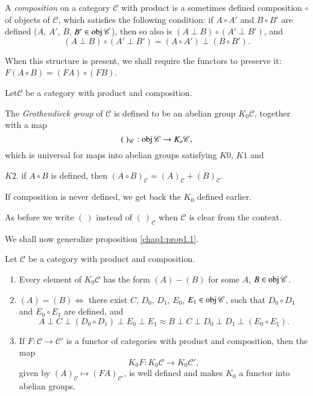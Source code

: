 \begin{defi*}%
A {\em composition} on a category $\mathscr{C}$ with product is a
sometimes defined composition $\circ$ of objects of $\mathscr{C}$, which
satisfies the following condition: if $A \circ A'$ and $B \circ B'$ are
defined ($A$, $A'$, $B$, $B' \in \operatorname{obj} \mathscr{C}$), then so also is
$(A \perp B) \circ (A' \perp B')$, and 
$$
(A \perp B) \circ (A' \perp B') = (A \circ A') \perp (B \circ B'). 
$$
\end{defi*}

When this structure is present, we shall require the functors to
preserve it: $F(A \circ B) = (FA) \circ (FB)$. 

\begin{defi*}%
Let\pageoriginale $\mathscr{C}$ be a category with product and composition.
\end{defi*}

The \textit{Grothendieck group} of $\mathscr{C}$ is defined to be an
abelian group $K_0 \mathscr{C}$, together with a map 
$$
(~ )_{\mathscr{C}} : \operatorname{obj} \mathscr{C} \to K_o \mathscr{C},
$$
which is universal for maps into abelian groups satisfying $K0$, $ K1$
and 

$K2$. if $A \circ B$ is defined, then $(A \circ B)_{\mathscr{C}} =
(A)_{\mathscr{C}} + (B)_{\mathscr{C}}$. 

If composition is never defined, we get back the $K_0$ defined earlier.

As before we write $(~)$ instead of $(~)_{\mathscr{C}}$ when
$\mathscr{C}$ is clear from the context. 

We shall now generalize proposition \ref{chap1:prop1.1}.

\begin{prop}\label{chap1:prop1.2} %
Let $\mathscr{C}$ be a category with product and composition. 
\begin{enumerate}
\renewcommand{\theenumi}{\alph{enumi}}
\renewcommand{\labelenumi}{(\theenumi)}
\item Every element of $K_0 \mathscr{C}$ has the form $(A) - (B)$
  for some $A$, $B \in \operatorname{obj} \mathscr{C}$. 

\item $(A) = (B) \Leftrightarrow$ there exist $C$, $D_0$, $D_1$,
  $E_0$, $E_1 \in \operatorname{obj} \mathscr{C}$, such that $D_0 \circ D_1$ and $E_0 \circ
  E_1$ are defined, and 
$$ 
A \perp C \perp (D_0 \circ D_1) \perp E_0 \perp E_1 \approx B \perp C
\perp D_0 \perp D_1 \perp (E_0 \circ E_1). 
$$

\item  If $F : \mathscr{C} \to \mathscr{C}'$ is a functor of
  categories with product and composition, then the map 
$$
K_0 F: K_0 \mathscr{C} \to K_0 \mathscr{C}',
$$
given by $(A)_\mathscr{C} \longmapsto (FA)_\mathscr{C'}$, is well
  defined and makes $K_0$ a functor into abelian groups. 
\end{enumerate}
\end{prop}

